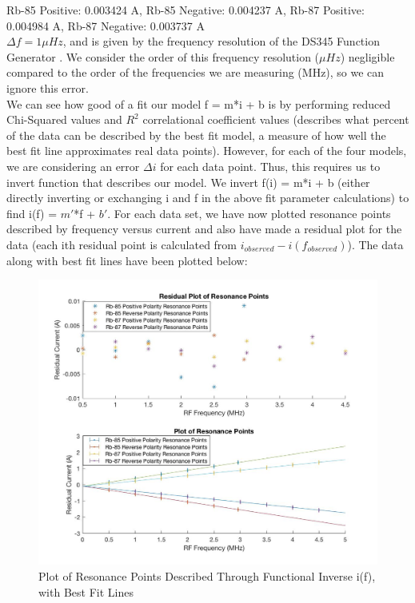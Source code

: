 \documentclass{article}
\begin{document}
\indent Rb-85 Positive: 0.003424 A, Rb-85 Negative: 0.004237 A, Rb-87 Positive: 0.004984 A, Rb-87 Negative: 0.003737 A
\\$\Delta f = 1 \mu Hz$, and is given by the frequency resolution of the DS345 Function Generator \cite{function}.
We consider the order of this frequency resolution ($\mu Hz$) negligible compared to the order of the frequencies we are measuring (MHz), so we can ignore this error.
\\\indent We can see how good of a fit our model f = m*i + b is by performing reduced Chi-Squared values and $R^2$ correlational coefficient values (describes what percent of the data can be described by the best fit model, a measure of how well the best fit line approximates real data points). However, for each of the four models, we are considering an error $\Delta i$ for each data point. Thus, this requires us to invert function that describes our model. We invert f(i) = m*i + b (either directly inverting or exchanging i and f in the above fit parameter calculations) to find i(f) = $m'$*f + $b'$. For each data set, we have now plotted resonance points described by frequency versus current and also have made a residual plot for the data (each ith residual point is calculated from $i_{observed} - i(f_{observed})$). The data along with best fit lines have been plotted below:
\begin{figure}[H] %
        \centering
        \includegraphics[scale = 0.25]{2.jpg}
        \caption{Plot of Resonance Points Described Through Functional Inverse i(f), with Best Fit Lines}
        \label{fig:my_label}
    \end{figure}
\end{document}
